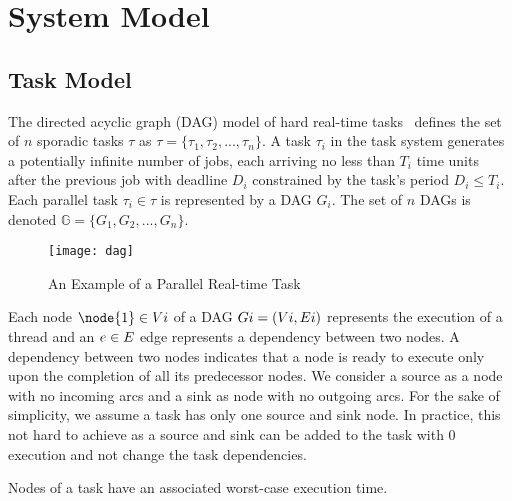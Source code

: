 \section{System Model}

\subsection{Task Model}
The directed acyclic graph (DAG) model of hard real-time
tasks~\addcite{} defines the set of ${n}$ sporadic tasks ${\tau}$ as
${\tau = \{\tau_1,\tau_2, ..., \tau_n\}}$. A task ${\tau_i}$
in the task system generates a potentially infinite number of jobs,
each arriving no less than ${T_i}$ time units after the previous
job with deadline ${D_i}$ constrained by the task's period
${D_i \leq T_i}$. Each parallel task ${\tau_i \in \tau}$
is represented by a DAG ${G_i}$. The set of ${n}$ DAGs is
denoted ${\mathbb{G} = \{G_1, G_2, ..., G_n\}}$.

\begin{figure}[!h]
  \centering
  \texttt{[image: dag]}
  \caption{An Example of a Parallel Real-time Task}
  \label{fig:dag}
  
\end{figure}

Each node ${\node{1} \in \nodeset{i}}$ of a DAG ${G{i} =
  (V{i}, E{i})}$ represents the 
execution of a thread and an ${e \in E{}}$ edge represents a
dependency between two nodes. A dependency between two nodes indicates
that a node is ready to execute only upon the completion of all its
predecessor nodes. We consider a source as a node with no incoming
arcs and a sink as node with no outgoing arcs. For the sake of
simplicity, we assume a task has only one source and sink node. In
practice, this not hard to achieve as a source and sink can be added
to the task with $0$ execution and not change the task dependencies.

Nodes of a task have an associated worst-case execution time. 

